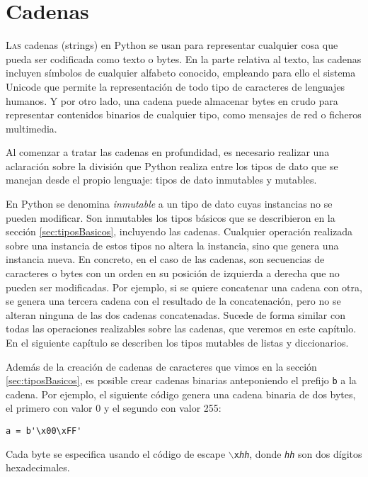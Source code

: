 
\chapter{Cadenas}
\label{chap:cadenas}

\lettrine[lines=5]{L}{as} cadenas (strings) en Python se usan para representar cualquier cosa que pueda ser codificada como texto o bytes. En la parte relativa al texto, las cadenas incluyen símbolos de cualquier alfabeto conocido, empleando para ello el sistema Unicode que permite la representación de todo tipo de caracteres de lenguajes humanos. Y por otro lado, una cadena puede almacenar bytes en crudo para representar contenidos binarios de cualquier tipo, como mensajes de red o ficheros multimedia.

Al comenzar a tratar las cadenas en profundidad, es necesario realizar una aclaración sobre la división que Python realiza entre los tipos de dato que se manejan desde el propio lenguaje: tipos de dato inmutables y mutables.

En Python se denomina \emph{inmutable} a un tipo de dato cuyas instancias no se pueden modificar. Son inmutables los tipos básicos que se describieron en la sección \ref{sec:tiposBasicos}, incluyendo las cadenas. Cualquier operación realizada sobre una instancia de estos tipos no altera la instancia, sino que genera una instancia nueva. En concreto, en el caso de las cadenas, son secuencias de caracteres o bytes con un orden en su posición de izquierda a derecha que no pueden ser modificadas. Por ejemplo, si se quiere concatenar una cadena con otra, se genera una tercera cadena con el resultado de la concatenación, pero no se alteran ninguna de las dos cadenas concatenadas. Sucede de forma similar con todas las operaciones realizables sobre las cadenas, que veremos en este capítulo. En el siguiente capítulo se describen los tipos mutables de listas y diccionarios. 

Además de la creación de cadenas de caracteres que vimos en la sección \ref{sec:tiposBasicos}, es posible crear cadenas binarias anteponiendo el prefijo \texttt{b} a la cadena. Por ejemplo, el siguiente código genera una cadena binaria de dos bytes, el primero con valor 0 y el segundo con valor 255:

\begin{lstlisting}
a = b'\x00\xFF'
\end{lstlisting}

Cada byte se especifica usando el código de escape \texttt{$\backslash$x\emph{hh}}, donde \texttt{\emph{hh}} son dos dígitos hexadecimales.

